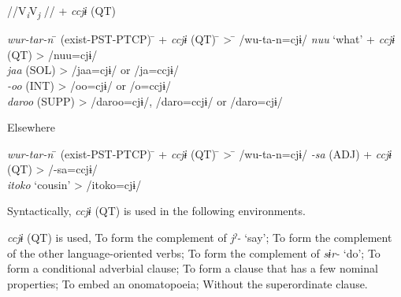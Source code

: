 \begin{xlist}
  \ex //V\textit{\textsubscript{i}}V\textit{\textsubscript{j} }// + \textit{ccjɨ} (QT)\\
  \begin{tabbing}
  \textit{wur-tar-n} \hspace{\tabcolsep}\=\hspace{\tabcolsep} (exist-PST-PTCP) \hspace{\tabcolsep}\=\hspace{\tabcolsep} +  \textit{ccjɨ}  (QT) \hspace{\tabcolsep}\=\hspace{\tabcolsep} > \hspace{\tabcolsep}\=\hspace{\tabcolsep} /wu-ta-n=cjɨ/\kill
  \textit{nuu}  \> ‘what’ \> +  \textit{ccjɨ}  (QT) \> > \> /nuu=cjɨ/\\
  \textit{jaa} \> (SOL) \>   \>    > \> /jaa=cjɨ/ or /ja=ccjɨ/\\
  \textit{{}-oo} \> (INT)   \>  \>   > \> /oo=cjɨ/ or /o=ccjɨ/\\
  \textit{daroo} \> (SUPP)   \>  \>   > \> /daroo=cjɨ/, /daro=ccjɨ/ or /daro=cjɨ/
  \end{tabbing}

  \ex Elsewhere\\
  \begin{tabbing}
  \textit{wur-tar-n} \hspace{\tabcolsep}\=\hspace{\tabcolsep} (exist-PST-PTCP) \hspace{\tabcolsep}\=\hspace{\tabcolsep} +  \textit{ccjɨ}  (QT) \hspace{\tabcolsep}\=\hspace{\tabcolsep} > \hspace{\tabcolsep}\=\hspace{\tabcolsep} /wu-ta-n=cjɨ/\kill
  \textit{{}-sa} \> (ADJ)  \> +  \textit{ccjɨ}  (QT)  \> > \> /-sa=ccjɨ/\\
  \textit{itoko} \> ‘cousin’    \> \>   > \> /itoko=cjɨ/
  \end{tabbing}
  \z
\z

Syntactically, \textit{ccjɨ} (QT) is used in the following environments.

\ea\label{ex:10.61}\textit{ccjɨ} (QT) is used,
  \ea  To form the complement of \textit{jˀ-} ‘say’;
  \ex  To form the complement of the other language-oriented verbs;
  \ex  To form the complement of \textit{sɨr-} ‘do’;
  \ex  To form a conditional adverbial clause;
  \ex  To form a clause that has a few nominal properties;
  \ex  To embed an onomatopoeia;
  \ex  Without the superordinate clause.
  \z
\z


\end{xlist}
